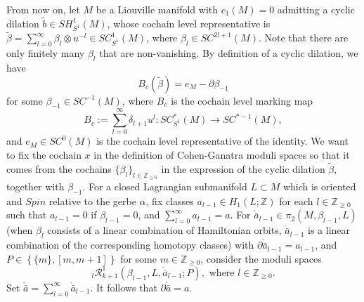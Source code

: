 \documentclass[a4paper]{article}
\numberwithin{equation}{section}
\begin{document}
From now on, let $M$ be a Liouville manifold with $c_1(M)=0$ admitting a cyclic dilation $\tilde{b}\in\mathit{SH}_{S^1}^1(M)$, whose cochain level representative is $\tilde{\beta}=\sum_{l=0}^\infty\beta_l\otimes u^{-l}\in\mathit{SC}_{S^1}^1(M)$, where $\beta_l\in\mathit{SC}^{2l+1}(M)$. Note that there are only finitely many $\beta_l$ that are non-vanishing. By definition of a cyclic dilation, we have
\begin{equation}\label{eq:cdilation}
B_c(\tilde{\beta})=e_M-\partial\beta_{-1}
\end{equation}
for some $\beta_{-1}\in\mathit{SC}^{-1}(M)$, where $B_c$ is the cochain level marking map
\begin{equation}\label{eq:marking}
B_c:=\sum_{l=0}^\infty\delta_{l+1}u^l:\mathit{SC}_{S^1}^\ast(M)\rightarrow\mathit{SC}^{\ast-1}(M),
\end{equation}
and $e_M\in\mathit{SC}^0(M)$ is the cochain level representative of the identity. We want to fix the cochain $x$ in the definition of Cohen-Ganatra moduli spaces so that it comes from the cochains $\{\beta_l\}_{l\in\mathbb{Z}_{\geq0}}$ in the expression of the cyclic dilation $\tilde{\beta}$, together with $\beta_{-1}$. For a closed Lagrangian submanifold $L\subset M$ which is oriented and $\mathit{Spin}$ relative to the gerbe $\alpha$, fix classes $a_{l-1}\in H_1(L;\mathbb{Z})$ for each $l\in\mathbb{Z}_{\geq0}$ such that $a_{l-1}=0$ if $\beta_{l-1}=0$, and $\sum_{l=0}^\infty a_{l-1}=a$. For $\ring{\bar{a}}_{l-1}\in\pi_2(M,\beta_{l-1},L)$ (when $\beta_l$ consists of a linear combination of Hamiltonian orbits, $\ring{\bar{a}}_{l-1}$ is a linear combination of the corresponding homotopy classes) with $\partial\ring{\bar{a}}_{l-1}=a_{l-1}$, and $P\in\left\{\{m\},[m,m+1]\right\}$ for some $m\in\mathbb{Z}_{\geq0}$, consider the moduli spaces
\begin{equation}
{}_l\mathcal{R}_{k+1}^1(\beta_{l-1},L,\ring{\bar{a}}_{l-1};P),\textrm{ where }l\in\mathbb{Z}_{\geq0}.
\end{equation}
Set $\ring{\bar{a}}=\sum_{l=0}^\infty\ring{\bar{a}}_{l-1}$. It follows that $\partial\ring{\bar{a}}=a$. 
\end{document}
